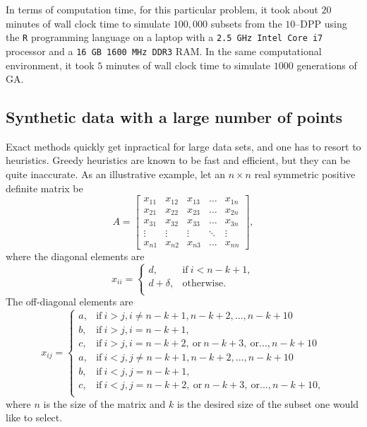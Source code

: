 \documentclass[]{interact}
\theoremstyle{plain}%
\theoremstyle{definition}
\theoremstyle{remark}
\begin{document}
In terms of computation time, for this particular problem, it took about $20$ minutes of wall clock time to simulate $100,000$ subsets from the $10$--DPP using the \texttt{R} programming language \cite{R} on a laptop with a \texttt{2.5 GHz Intel Core i7} processor and a \texttt{16 GB 1600 MHz DDR3} RAM. In the same computational environment, it took $5$ minutes of wall clock time to simulate $1000$ generations of GA. 

\subsection{Synthetic data with a large number of points}
Exact methods quickly get inpractical for large data sets, and one has to resort to heuristics. Greedy heuristics are known to be fast and efficient, but they can be quite inaccurate. As an illustrative example, let an $n \times n$ real symmetric positive definite matrix be
\begin{equation*}
	A = 
	\begin{bmatrix}

    x_{11} & x_{12} & x_{13} & \dots  & x_{1n} \\
    x_{21} & x_{22} & x_{23} & \dots  & x_{2n} \\
    x_{31} & x_{32} & x_{33} & \dots  & x_{3n} \\
    \vdots & \vdots & \vdots & \ddots & \vdots \\
    x_{n1} & x_{n2} & x_{n3} & \dots  & x_{nn}

	\end{bmatrix},
\end{equation*} where the diagonal elements are
\begin{equation*}
	x_{ii} = 
	\begin{cases}
       d, & \text{if} \ i < n-k+1, \\
       d + \delta, & \text{otherwise.} \\
    \end{cases}
\end{equation*} The off-diagonal elements are
\begin{equation*}
	x_{ij} = 
	\begin{cases}
		a, & \text{if} \ i > j, i \neq n-k+1,n-k+2,...,n-k+10 \\
		b, & \text{if} \ i > j, i = n-k+1, \\
		c, & \text{if} \ i > j, i = n-k+2, \ \text{or} \ n-k+3, \ \text{or}..., n-k+10\\
		a, & \text{if} \ i < j, j \neq n-k+1,n-k+2,...,n-k+10 \\
		b, & \text{if} \ i < j, j = n-k+1, \\
		c, & \text{if} \ i < j, j = n-k+2, \ \text{or} \ n-k+3, \ \text{or}..., n-k+10,\\
	\end{cases}
\end{equation*} where $n$ is the size of the matrix and $k$ is the desired size of the subset one would like to select. 
\end{document}
